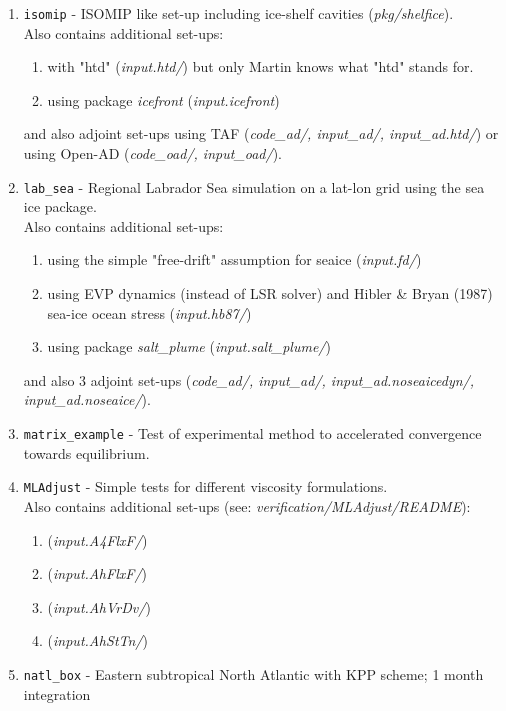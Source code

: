\begin{enumerate}
\item \texttt{isomip} - ISOMIP like set-up including ice-shelf cavities
  ({\it pkg/shelfice}).\\
  Also contains additional set-ups:
  \begin{enumerate}
   \item with "htd" ({\it input.htd/})
          but only Martin knows what "htd" stands for.
   \item using package {\it icefront} ({\it input.icefront})
  \end{enumerate}
  and also adjoint set-ups using TAF ({\it code\_ad/, input\_ad/, input\_ad.htd/})
  or using Open-AD ({\it code\_oad/, input\_oad/}).

\item \texttt{lab\_sea} - Regional Labrador Sea simulation on a lat-lon
  grid using the sea ice package.\\
  Also contains additional set-ups:
  \begin{enumerate}
   \item using the simple "free-drift" assumption for seaice ({\it input.fd/})
   \item using EVP dynamics (instead of LSR solver) and Hibler \& Bryan (1987)
         sea-ice ocean stress ({\it input.hb87/})
   \item using package {\it salt\_plume} ({\it input.salt\_plume/})
  \end{enumerate}
  and also 3 adjoint set-ups ({\it code\_ad/, input\_ad/, input\_ad.noseaicedyn/,
   input\_ad.noseaice/}).

\item \texttt{matrix\_example} - Test of experimental method to
  accelerated convergence towards equilibrium.

\item \texttt{MLAdjust} - Simple tests for different viscosity formulations.\\
  Also contains additional set-ups (see: {\it verification/MLAdjust/README}):
  \begin{enumerate}
   \item ({\it input.A4FlxF/})
   \item ({\it input.AhFlxF/})
   \item ({\it input.AhVrDv/})
   \item ({\it input.AhStTn/})
  \end{enumerate}

\item \texttt{natl\_box} - Eastern subtropical North Atlantic with KPP
  scheme; 1 month integration


\end{enumerate}
